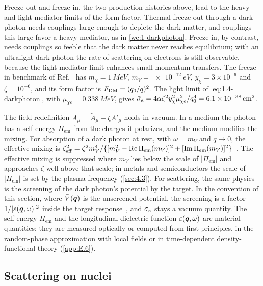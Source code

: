 Freeze-out and freeze-in, the two production histories above, lead to the heavy- and light-mediator limits of the form factor. Thermal freeze-out through a dark photon needs couplings large enough to deplete the dark matter, and couplings this large favor a heavy mediator, as in \cref{we:1-darkphoton}. Freeze-in, by contrast, needs couplings so feeble that the dark matter never reaches equilibrium; with an ultralight dark photon the rate of scattering on electrons is still observable, because the light-mediator limit enhances small momentum transfers. The freeze-in benchmark of Ref.~\cite[Sect.~III\,D]{lin2019tasi} has $m_\chi = \SI{1}{MeV}$, $m_V = \SI{e-12}{eV}$, $y_\chi = 3\times10^{-6}$ and $\zeta = 10^{-6}$, and its form factor is $F_{\mathrm{DM}} = (q_0/q)^2$. The light limit of \cref{eq:1.4-darkphoton}, with $\mu_{\chi e} = \SI{0.338}{MeV}$, gives $\bar{\sigma}_{e} = 4\alpha\zeta^2 y_\chi^2\mu_{\chi e}^2/q_0^4 = \SI{6.1e-38}{cm^2}$.

The field redefinition $A_\mu = \tilde A_\mu + \zeta A'_\mu$ holds in vacuum. In a medium the photon has a self-energy $\Pi_{\mathrm{em}}$ from the charges it polarizes, and the medium modifies the mixing. For absorption of a dark photon at rest, with $\omega = m_V$ and $q \to 0$, the effective mixing is $\zeta_{\mathrm{eff}}^2 = \zeta^2 m_V^4/\{[m_V^2 - \operatorname{Re}\Pi_{\mathrm{em}}(m_V)]^2 + [\operatorname{Im}\Pi_{\mathrm{em}}(m_V)]^2\}$~\cite[Eqs.~(5) and (6), with $\kappa$ for $\zeta$]{hochberg2017absorption}. The effective mixing is suppressed where $m_V$ lies below the scale of $|\Pi_{\mathrm{em}}|$ and approaches $\zeta$ well above that scale; in metals and semiconductors the scale of $|\Pi_{\mathrm{em}}|$ is set by the plasma frequency (\cref{sec:4.3}). For scattering, the same physics is the screening of the dark photon's potential by the target. In the convention of this section, where $\tilde V(\bm{q})$ is the unscreened potential, the screening is a factor $1/|\varepsilon(\bm{q}, \omega)|^2$ inside the target response~\cite[Eqs.~(6) and (8)]{knapen2021dark}, and $\bar{\sigma}_{e}$ stays a vacuum quantity. The self-energy $\Pi_{\mathrm{em}}$ and the longitudinal dielectric function $\varepsilon(\bm{q}, \omega)$ are material quantities: they are measured optically or computed from first principles, in the random-phase approximation with local fields or in time-dependent density-functional theory (\cref{app:E.6}).

\subsection{Scattering on nuclei}

